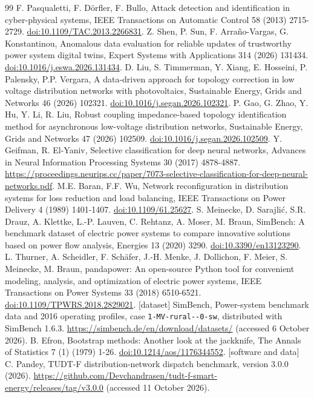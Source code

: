 \documentclass[preprint,12pt]{elsarticle}
\begin{document}
\begin{thebibliography}{99}
 F. Pasqualetti, F. D\"orfler, F. Bullo, Attack detection and identification in cyber-physical systems, IEEE Transactions on Automatic Control 58 (2013) 2715-2729. \href{https://doi.org/10.1109/TAC.2013.2266831}{doi:10.1109/TAC.2013.2266831}.
 Z. Shen, P. Sun, F. Arra\~no-Vargas, G. Konstantinou, Anomalous data evaluation for reliable updates of trustworthy power system digital twins, Expert Systems with Applications 314 (2026) 131434. \href{https://doi.org/10.1016/j.eswa.2026.131434}{doi:10.1016/j.eswa.2026.131434}.
 D. Liu, S. Timmerman, Y. Xiang, E. Hosseini, P. Palensky, P.P. Vergara, A data-driven approach for topology correction in low voltage distribution networks with photovoltaics, Sustainable Energy, Grids and Networks 46 (2026) 102321. \href{https://doi.org/10.1016/j.segan.2026.102321}{doi:10.1016/j.segan.2026.102321}.
 P. Gao, G. Zhao, Y. Hu, Y. Li, R. Liu, Robust coupling impedance-based topology identification method for asynchronous low-voltage distribution networks, Sustainable Energy, Grids and Networks 47 (2026) 102509. \href{https://doi.org/10.1016/j.segan.2026.102509}{doi:10.1016/j.segan.2026.102509}.
 Y. Geifman, R. El-Yaniv, Selective classification for deep neural networks, Advances in Neural Information Processing Systems 30 (2017) 4878-4887. \url{https://proceedings.neurips.cc/paper/7073-selective-classification-for-deep-neural-networks.pdf}.
 M.E. Baran, F.F. Wu, Network reconfiguration in distribution systems for loss reduction and load balancing, IEEE Transactions on Power Delivery 4 (1989) 1401-1407. \href{https://doi.org/10.1109/61.25627}{doi:10.1109/61.25627}.
 S. Meinecke, D. Sarajli\'c, S.R. Drauz, A. Klettke, L.-P. Lauven, C. Rehtanz, A. Moser, M. Braun, SimBench: A benchmark dataset of electric power systems to compare innovative solutions based on power flow analysis, Energies 13 (2020) 3290. \href{https://doi.org/10.3390/en13123290}{doi:10.3390/en13123290}.
 L. Thurner, A. Scheidler, F. Sch\"afer, J.-H. Menke, J. Dollichon, F. Meier, S. Meinecke, M. Braun, pandapower: An open-source Python tool for convenient modeling, analysis, and optimization of electric power systems, IEEE Transactions on Power Systems 33 (2018) 6510-6521. \href{https://doi.org/10.1109/TPWRS.2018.2829021}{doi:10.1109/TPWRS.2018.2829021}.
 [dataset] SimBench, Power-system benchmark data and 2016 operating profiles, case \texttt{1-MV-rural-{}-0-sw}, distributed with SimBench 1.6.3. \url{https://simbench.de/en/download/datasets/} (accessed 6 October 2026).
 B. Efron, Bootstrap methods: Another look at the jackknife, The Annals of Statistics 7 (1) (1979) 1-26. \href{https://doi.org/10.1214/aos/1176344552}{doi:10.1214/aos/1176344552}.
 [software and data] C. Pandey, TUDT-F distribution-network dispatch benchmark, version 3.0.0 (2026). \url{https://github.com/Devchandrasen/tudt-f-smart-energy/releases/tag/v3.0.0} (accessed 11 October 2026).
\end{thebibliography}
\end{document}
